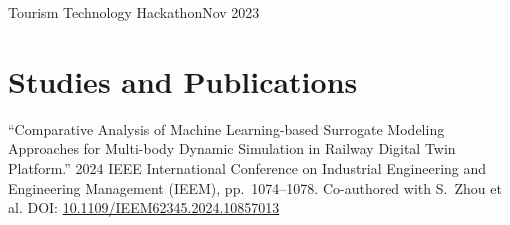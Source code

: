\documentclass{ExpressiveResume}
\begin{document}
{Tourism Technology Hackathon}{Nov 2023}{}
{
}


\section{Studies and Publications}
{
\noindent ``Comparative Analysis of Machine Learning-based Surrogate Modeling Approaches for Multi-body Dynamic Simulation in Railway Digital Twin Platform.'' 2024 IEEE International Conference on Industrial Engineering and Engineering Management (IEEM), pp.~1074--1078. Co-authored with S.~Zhou et al. DOI: \href{https://doi.org/10.1109/IEEM62345.2024.10857013}{10.1109/IEEM62345.2024.10857013}
}





\end{document}
